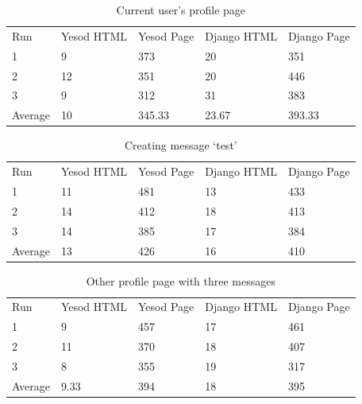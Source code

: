 \begin{table}[H]
    \caption{Current user's profile page}
    \begin{center}
        \begin{tabular}{ | l | l | l | l | l |}
            \hline
            Run & Yesod HTML & Yesod Page & Django HTML & Django Page \\
            1 & 9 & 373 & 20 & 351 \\
            2 & 12 & 351 & 20 & 446 \\
            3 & 9 & 312 & 31 & 383 \\
            Average & 10 & 345.33 & 23.67 & 393.33 \\
            \hline
        \end{tabular}
    \end{center}
    \label{tab:currentProfileLoadSpeeds}
\end{table}

\begin{table}[H]
    \caption{Creating message `test'}
    \begin{center}
        \begin{tabular}{ | l | l | l | l | l |}
            \hline
            Run & Yesod HTML & Yesod Page & Django HTML & Django Page \\
            1 & 11 & 481 & 13 & 433 \\
            2 & 14 & 412 & 18 & 413 \\
            3 & 14 & 385 & 17 & 384 \\
            Average & 13 & 426 & 16 & 410 \\
            \hline
        \end{tabular}
    \end{center}
    \label{tab:createMessageLoadSpeeds}
\end{table}

\begin{table}[H]
    \caption{Other profile page with three messages}
    \begin{center}
        \begin{tabular}{ | l | l | l | l | l |}
            \hline
            Run & Yesod HTML & Yesod Page & Django HTML & Django Page \\
            1 & 9 & 457 & 17 & 461 \\
            2 & 11 & 370 & 18 & 407 \\
            3 & 8 & 355 & 19 & 317 \\
            Average & 9.33 & 394 & 18 & 395 \\
            \hline
        \end{tabular}
    \end{center}
    \label{tab:otherProfileLoadSpeeds}
\end{table}

